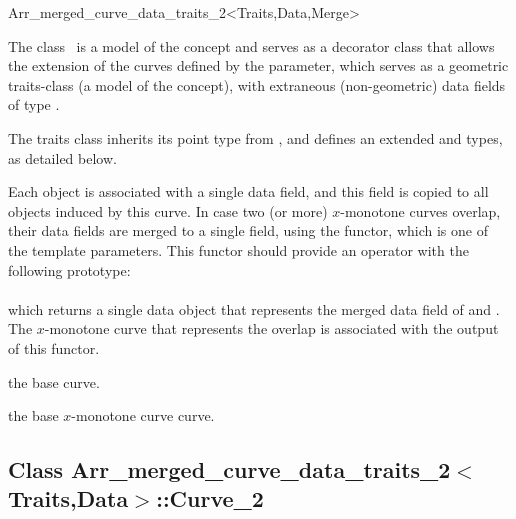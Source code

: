 
\ccRefPageBegin
\begin{ccRefClass}{Arr_merged_curve_data_traits_2<Traits,Data,Merge>}

\ccDefinition

The class \ccRefName\ is a model of the  concept
and serves as a decorator class that allows the extension of the curves
defined by the  parameter, which serves as a geometric
traits-class (a model of the  concept), with
extraneous (non-geometric) data fields of type .

The traits class inherits its point type from ,
and defines an extended  and  types,
as detailed below.

Each  object is associated with a single data field, and this
field is copied to all  objects induced by this curve.
In case two (or more) $x$-monotone curves overlap, their data fields are
merged to a single field, using the  functor, which is one of
the template parameters. This functor should provide an operator with the
following prototype: \\
\indent {} \\
which returns a single data object that represents the merged data field
of  and . The $x$-monotone curve that represents the overlap
is associated with the output of this functor.

 
\ccIsModel

\ccInheritsFrom

\ccTypes

    {the base curve.}

    {the base $x$-monotone curve curve.}

\subsection*{Class 
 Arr\_merged\_curve\_data\_traits\_2$<$Traits,Data$>$::Curve\_2}


\end{ccRefClass}
